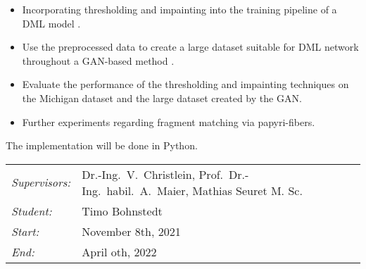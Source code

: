 \documentclass[12pt,a4paper]{article}
\begin{document}
\begin{itemize}
	\item Incorporating thresholding \cite{Tensmeyer20, Pratikakis19} and impainting \cite{Liu18Impainting} into the training pipeline of a DML model \cite{Musgrave20}.
	      	      	      	      	      	      	      		      		      	      	      	      	      	      	      	      	      	      	
	\item Use the preprocessed data to create a large dataset suitable for DML network throughout a GAN-based method \cite{Antoniou18}.
	      	      	      	      	      	      	      		      		      	      	      	      	      	      	      	      	      	      
	\item Evaluate the performance of the thresholding and impainting techniques on the Michigan dataset \cite{Pirrone21} and the large dataset created by the GAN.
	      	      	      	      	      	      	      		      		      	      	      	      	      	      	      	      	      	      	
	\item Further experiments regarding fragment matching via papyri-fibers.
	      	      	      	      	      	      	      		      		      	      	      	      	      	      	      	      	      	      
\end{itemize}
		
		
The implementation will be done in Python.\\
		
\begin{tabular}{ll}
	\emph{Supervisors:} & Dr.-Ing.~V.~Christlein,  Prof.~Dr.-Ing.~habil.~A.~Maier, Mathias Seuret M. Sc.
	\\
	\emph{Student:}     & Timo Bohnstedt
	\\
	\emph{Start:}       & November 8th, 2021                                            \\
	\emph{End:}         & April oth, 2022                                        \\
\end{tabular}
\nopagebreak[4]
\small

		
\end{document}
